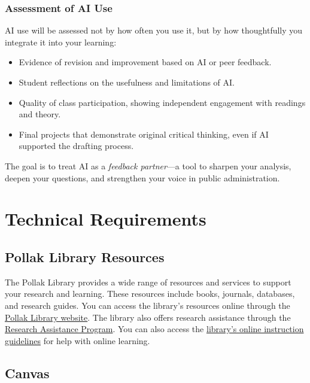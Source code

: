 \documentclass[12pt]{article}     %
\begin{document}
	\subsubsection*{Assessment of AI Use}
	
	AI use will be assessed not by how often you use it, but by how thoughtfully you integrate it into your learning:
	
	\begin{itemize}
	    \item Evidence of revision and improvement based on AI or peer feedback.
	    \item Student reflections on the usefulness and limitations of AI.
	    \item Quality of class participation, showing independent engagement with readings and theory.
	    \item Final projects that demonstrate original critical thinking, even if AI supported the drafting process.
	\end{itemize}
	
	\noindent The goal is to treat AI as a \textit{feedback partner}---a tool to sharpen your analysis, deepen your questions, and strengthen your voice in public administration.

\section{Technical Requirements}

	\subsection*{Pollak Library Resources}
	
	The Pollak Library provides a wide range of resources and services to support your research and learning. These resources include books, journals, databases, and research guides. You can access the library's resources online through the \href{http://www.library.fullerton.edu/}{Pollak Library website}. The library also offers research assistance through the \href{http://www.library.fullerton.edu/research/}{Research Assistance Program}. You can also access the \href{http://www.library.fullerton.edu/about/guidelines/online-instruction-guidelines.php}{library's online instruction guidelines} for help with online learning.
	
	\subsection*{Canvas}
	
\end{document}
